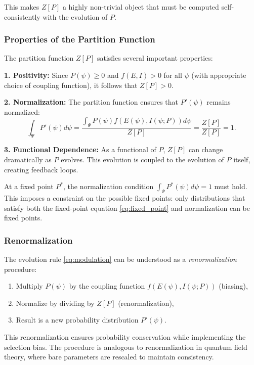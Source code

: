 \documentclass[12pt,a4paper]{article}
\theoremstyle{definition}
\theoremstyle{remark}
\begin{document}
This makes $Z[P]$ a highly non-trivial object that must be computed self-consistently with the evolution of $P$.

\subsubsection{Properties of the Partition Function}

The partition function $Z[P]$ satisfies several important properties:

\textbf{1. Positivity:} Since $P(\psi) \geq 0$ and $f(E, I) > 0$ for all $\psi$ (with appropriate choice of coupling function), it follows that $Z[P] > 0$.

\textbf{2. Normalization:} The partition function ensures that $P'(\psi)$ remains normalized:
\begin{equation}
\int_\Psi P'(\psi) d\psi = \frac{\int_\Psi P(\psi) f(E(\psi), I(\psi; P)) d\psi}{Z[P]} = \frac{Z[P]}{Z[P]} = 1.
\end{equation}

\textbf{3. Functional Dependence:} As a functional of $P$, $Z[P]$ can change dramatically as $P$ evolves. This evolution is coupled to the evolution of $P$ itself, creating feedback loops.

At a fixed point $P^*$, the normalization condition $\int_\Psi P^*(\psi) d\psi = 1$ must hold. This imposes a constraint on the possible fixed points: only distributions that satisfy both the fixed-point equation \eqref{eq:fixed_point} and normalization can be fixed points.

\subsubsection{Renormalization}

The evolution rule \eqref{eq:modulation} can be understood as a \emph{renormalization} procedure:
\begin{enumerate}
\item Multiply $P(\psi)$ by the coupling function $f(E(\psi), I(\psi; P))$ (biasing),
\item Normalize by dividing by $Z[P]$ (renormalization),
\item Result is a new probability distribution $P'(\psi)$.
\end{enumerate}

This renormalization ensures probability conservation while implementing the selection bias. The procedure is analogous to renormalization in quantum field theory, where bare parameters are rescaled to maintain consistency.
\end{document}
